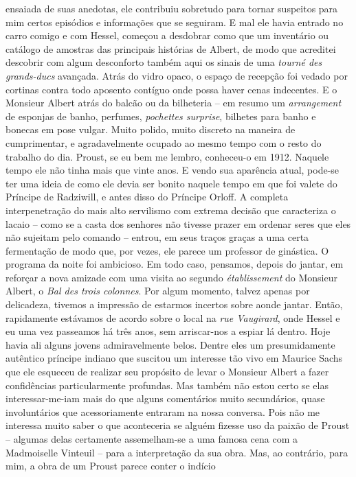 ensaiada de suas anedotas, ele contribuiu sobretudo para tornar
suspeitos para mim certos episódios e informações que se seguiram. E mal
ele havia entrado no carro comigo e com Hessel, começou a desdobrar como
que um inventário ou catálogo de amostras das principais histórias de
Albert, de modo que acreditei descobrir com algum desconforto também
aqui os sinais de uma \emph{tourné des grands-ducs} avançada. Atrás do
vidro opaco, o espaço de recepção foi vedado por cortinas contra todo
aposento contíguo onde possa haver cenas indecentes. E o Monsieur Albert
atrás do balcão ou da bilheteria -- em resumo um \emph{arrangement} de
esponjas de banho, perfumes, \emph{pochettes surprise}, bilhetes para
banho e bonecas em pose vulgar. Muito polido, muito discreto na maneira
de cumprimentar, e agradavelmente ocupado ao mesmo tempo com o resto do
trabalho do dia. Proust, se eu bem me lembro, conheceu-o em 1912.
Naquele tempo ele não tinha mais que vinte anos. E vendo sua aparência
atual, pode-se ter uma ideia de como ele devia ser bonito naquele tempo
em que foi valete do Príncipe de Radziwill, e antes disso do Príncipe
Orloff. A completa interpenetração do mais alto servilismo com extrema
decisão que caracteriza o lacaio -- como se a casta dos senhores não
tivesse prazer em ordenar seres que eles não sujeitam pelo comando --
entrou, em seus traços graças a uma certa fermentação de modo que, por
vezes, ele parece um professor de ginástica. O programa da noite foi
ambicioso. Em todo caso, pensamos, depois do jantar, em reforçar a nova
amizade com uma visita ao segundo \emph{établissement} do Monsieur
Albert, o \emph{Bal des trois colonnes}. Por algum momento, talvez
apenas por delicadeza, tivemos a impressão de estarmos incertos sobre
aonde jantar. Então, rapidamente estávamos de acordo sobre o local na
\emph{rue Vaugirard}, onde Hessel e eu uma vez passeamos há três anos,
sem arriscar-nos a espiar lá dentro. Hoje havia ali alguns jovens
admiravelmente belos. Dentre eles um presumidamente autêntico príncipe
indiano que suscitou um interesse tão vivo em Maurice Sachs que ele
esqueceu de realizar seu propósito de levar o Monsieur Albert a fazer
confidências particularmente profundas. Mas também não estou certo se
elas interessar-me-iam mais do que alguns comentários muito secundários,
quase involuntários que acessoriamente entraram na nossa conversa. Pois
não me interessa muito saber o que aconteceria se alguém fizesse uso da
paixão de Proust -- algumas delas certamente assemelham-se a uma famosa
cena com a Madmoiselle Vinteuil -- para a interpretação da sua obra.
Mas, ao contrário, para mim, a obra de um Proust parece conter o indício
